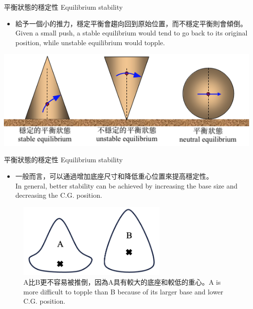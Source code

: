 \documentclass[beamer=true]{standalone}
\begin{document}
\begin{frame}{平衡狀態的穩定性 Equilibrium stability}
    \begin{itemize}
        \item 給予一個小的推力，穩定平衡會趨向回到原始位置，而不穩定平衡則會傾倒。\\Given a small push, a stable equilibrium would tend to go back to its original position, while unstable equilibrium would topple.
    \end{itemize}\bigskip
    {\par\centering
        \includegraphics[width=.8\textwidth]{assets/84b8e1a5.png}
        \par}
\end{frame}
\begin{frame}{平衡狀態的穩定性 Equilibrium stability}
    \begin{itemize}
        \item 一般而言，可以通過增加底座尺寸和降低重心位置來提高穩定性。\\In general, better stability can be achieved by increasing the base size and decreasing the C.G. position.
    \end{itemize}
    \begin{figure}
        \centering
        \includegraphics[width=0.66\textwidth]{assets/5f31a348.png}
        \caption{A比B更不容易被推倒，因為A具有較大的底座和較低的重心。A is more difficult to topple than B because of its larger base and lower C.G. position.}
        \label{fig:enter-label}
    \end{figure}
\end{frame}
\end{document}
